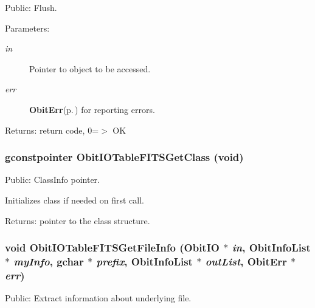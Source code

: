 Public: Flush. 

\begin{Desc}
\item[Parameters:]
\begin{description}
\item[{\em in}]Pointer to object to be accessed. \item[{\em err}]{\bf Obit\-Err}{\rm (p.\,\pageref{structObitErr})} for reporting errors. \end{description}
\end{Desc}
\begin{Desc}
\item[Returns:]return code, 0=$>$ OK \end{Desc}
\subsubsection{\setlength{\rightskip}{0pt plus 5cm}gconstpointer Obit\-IOTable\-FITSGet\-Class (void)}\label{ObitIOTableFITS_8c_a13}


Public: Class\-Info pointer. 

Initializes class if needed on first call. \begin{Desc}
\item[Returns:]pointer to the class structure. \end{Desc}
\subsubsection{\setlength{\rightskip}{0pt plus 5cm}void Obit\-IOTable\-FITSGet\-File\-Info ({\bf Obit\-IO} $\ast$ {\em in}, {\bf Obit\-Info\-List} $\ast$ {\em my\-Info}, gchar $\ast$ {\em prefix}, {\bf Obit\-Info\-List} $\ast$ {\em out\-List}, {\bf Obit\-Err} $\ast$ {\em err})}\label{ObitIOTableFITS_8c_a31}


Public: Extract information about underlying file. 

